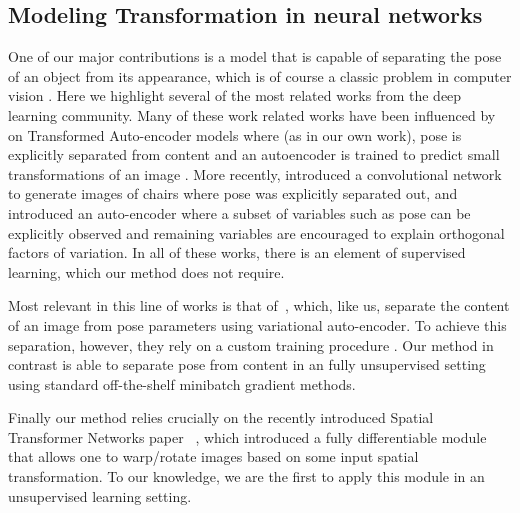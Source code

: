 \subsection{Modeling Transformation in neural networks}
One of our major contributions is a model that is capable of separating the pose of an object from its appearance,
which is of course a classic problem in computer vision . 
Here we highlight several of the most related works from 
the deep learning community.  
Many of these work related works have been influenced by \cite{hinton2011transforming} on Transformed Auto-encoder models
where (as in our own work), pose is explicitly separated from content and an autoencoder is trained to predict small transformations of an image .	
More recently,  \cite{dosovitskiy2014learning} introduced a convolutional network to generate images of chairs where pose was explicitly separated out, and
\cite{cheung2014discovering} introduced an auto-encoder where a subset of variables such as pose can be explicitly observed and remaining
variables are encouraged to explain orthogonal factors of variation.   
In all of these works, there is an element of supervised learning, which our method does not require. 

Most relevant in this line of works is that of~\cite{kulkarni2015deep}, which, like us, 
separate the content of an image from pose parameters using variational auto-encoder.
To achieve this separation, however, they rely on a custom training procedure 
.
Our method in contrast is able to separate pose from content in an fully unsupervised setting 
using standard off-the-shelf minibatch gradient methods.

Finally our method relies crucially on the recently introduced Spatial
Transformer Networks paper
 ~\citep{jaderberg2015spatial}, which introduced 
a fully differentiable module that allows one to warp/rotate images based on some input spatial transformation.
To our knowledge, we are the first to apply this module in an unsupervised learning setting.  


